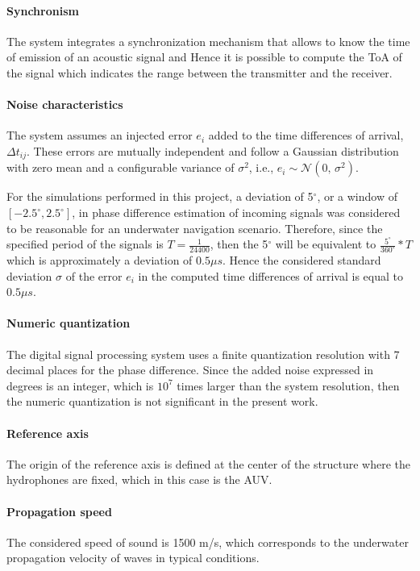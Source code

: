 \paragraph{Synchronism} The system integrates a synchronization mechanism that allows to know the time of emission of an acoustic signal and  Hence it is possible to compute the ToA of the signal which indicates the range between the transmitter and the receiver.

\paragraph{Noise characteristics} The system assumes an injected error $e_i$ added to the time differences of arrival, $ \Delta t_{ij}$. These errors are mutually independent and follow a Gaussian distribution with zero mean and a configurable variance of $\sigma^{2}$, i.e., $e_i \sim \mathcal{N}(0,\,\sigma^{2})$. 

For the simulations performed in this project, a deviation of 5$^{\circ}$, or a window of $[-2.5^{\circ},2.5^{\circ}]$, in phase difference estimation of incoming signals was considered to be reasonable for an underwater navigation scenario. Therefore, since the specified period of the signals is $T = \frac{1}{24400}$, then the 5$^{\circ}$ will be equivalent to $\frac{5^{\circ}}{360^{\circ}}*T$ which is approximately a deviation of $0.5\mu s$. Hence the considered standard deviation $\sigma$ of the error $e_i$ in the computed time differences of arrival is equal to $0.5\mu s$.

\paragraph{Numeric quantization} The digital signal processing system uses a finite quantization resolution with 7 decimal places for the phase difference. Since the added noise expressed in degrees is an integer, which is $10^7$ times larger than the system resolution, then the numeric quantization is not significant in the present work.

\paragraph{Reference axis} The origin of the reference axis is defined at the center of the structure where the hydrophones are fixed, which in this case is the AUV.

\paragraph{Propagation speed} The considered speed of sound is 1500 m/s, which corresponds
to the underwater propagation velocity of waves in typical conditions.

